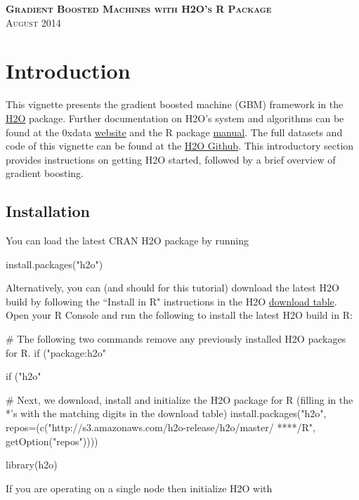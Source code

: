 \documentclass[11pt]{article}
\begin{document}
\thispagestyle{empty} %

\begin{center}
\textsc{\Large\bf{Gradient Boosted Machines with H2O's R Package}}
\\
\bigskip
\textsc{August 2014}
\end{center}
\bigskip
\bigskip
\bigskip
\bigskip
\tableofcontents

\newpage


\section{Introduction} \label{1}

This vignette presents the gradient boosted machine (GBM) framework in the \href{http://cran.r-project.org/web/packages/h2o/index.html}{H2O} package. Further documentation on H2O's system and algorithms can be found at the 0xdata \href{http://docs.0xdata.com}{website} and the R package \href{http://cran.r-project.org/web/packages/h2o/h2o.pdf}{manual}. The full datasets and code of this vignette can be found at the \href{https://github.com/0xdata/h2o}{H2O Github}. This introductory section provides instructions on getting H2O started, followed by a brief overview of gradient boosting.


\subsection{Installation} \label{1.1}

You can load the latest CRAN H2O package by running

\begin{spverbatim}
install.packages("h2o")
\end{spverbatim}
\bigskip
\noindent
Alternatively, you can (and should for this tutorial) download the latest H2O build by following the ``Install in R" instructions in the H2O \href{http://s3.amazonaws.com/h2o-release/h2o/master/latest.html}{download table}. Open your R Console and run the following to install the latest H2O build in R:

\begin{spverbatim}
# The following two commands remove any previously installed H2O packages for R.
if ("package:h2o" %

if ("h2o" %

# Next, we download, install and initialize the H2O package for R (filling in the *'s with the matching digits in the download table)
install.packages("h2o", repos=(c("http://s3.amazonaws.com/h2o-release/h2o/master/
****/R", getOption("repos"))))

library(h2o)

\end{spverbatim}
\noindent
If you are operating on a single node then initialize H2O with
\end{document}
